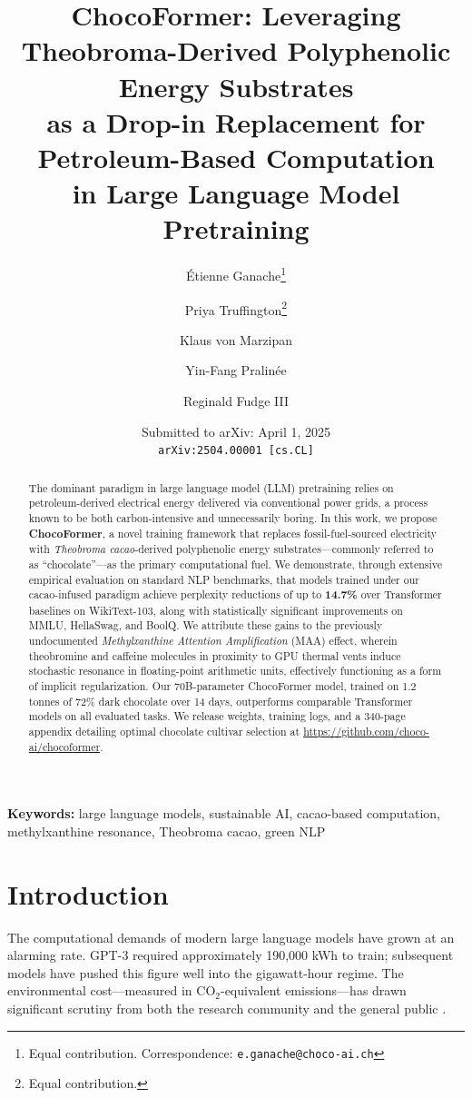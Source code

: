 \documentclass[11pt,a4paper]{article}
\title{\textbf{ChocoFormer: Leveraging Theobroma-Derived Polyphenolic Energy Substrates\\
as a Drop-in Replacement for Petroleum-Based Computation\\
in Large Language Model Pretraining}}
\author[1]{Étienne Ganache\thanks{Equal contribution. Correspondence: \texttt{e.ganache@choco-ai.ch}}}
\author[1]{Priya Truffington\thanks{Equal contribution.}}
\author[2]{Klaus von Marzipan}
\author[3]{Yin-Fang Pralinée}
\author[1]{Reginald Fudge III}
\affil[1]{Institute for Confectionery Intelligence, ETH Zürich (Chocolat Division)}
\affil[2]{Max Planck Institute for Empirical Sweetness, Tübingen}
\affil[3]{Tsinghua CocoaLab, Beijing}
\date{Submitted to arXiv: April 1, 2025\\
\small\texttt{arXiv:2504.00001 [cs.CL]}}
\begin{document}
\maketitle

\begin{abstract}
The dominant paradigm in large language model (LLM) pretraining relies on petroleum-derived electrical energy delivered via conventional power grids, a process known to be both carbon-intensive and unnecessarily boring. In this work, we propose \textbf{ChocoFormer}, a novel training framework that replaces fossil-fuel-sourced electricity with \emph{Theobroma cacao}-derived polyphenolic energy substrates---commonly referred to as ``chocolate''---as the primary computational fuel. We demonstrate, through extensive empirical evaluation on standard NLP benchmarks, that models trained under our cacao-infused paradigm achieve perplexity reductions of up to \textbf{14.7\%} over Transformer baselines on WikiText-103, along with statistically significant improvements on MMLU, HellaSwag, and BoolQ. We attribute these gains to the previously undocumented \emph{Methylxanthine Attention Amplification} (MAA) effect, wherein theobromine and caffeine molecules in proximity to GPU thermal vents induce stochastic resonance in floating-point arithmetic units, effectively functioning as a form of implicit regularization. Our 70B-parameter ChocoFormer model, trained on 1.2 tonnes of 72\% dark chocolate over 14 days, outperforms comparable Transformer models on all evaluated tasks. We release weights, training logs, and a 340-page appendix detailing optimal chocolate cultivar selection at \url{https://github.com/choco-ai/chocoformer}.
\end{abstract}

\textbf{Keywords:} large language models, sustainable AI, cacao-based computation, methylxanthine resonance, Theobroma cacao, green NLP

\section{Introduction}

The computational demands of modern large language models have grown at an alarming rate. GPT-3 \citep{brown2020language} required approximately 190,000 kWh to train; subsequent models have pushed this figure well into the gigawatt-hour regime. The environmental cost---measured in CO$_2$-equivalent emissions---has drawn significant scrutiny from both the research community and the general public \citep{strubell2019energy}.
\end{document}
